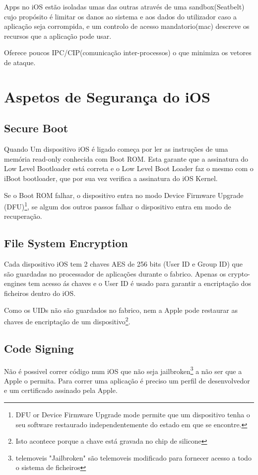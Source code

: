 
\hfill\par
Apps no iOS estão isoladas umas das outras através de uma sandbox(Seatbelt) cujo propósito é limitar os danos ao sistema e aos dados do utilizador caso a aplicação seja corrompida, e um controlo de acesso mandatorio(mac) descreve os recursos que a aplicação pode usar.\par

Oferece poucos IPC/CIP(comunicação inter-processos) o que minimiza os vetores de ataque.

\section{Aspetos de Segurança do iOS}

\subsection{Secure Boot}
\hfill\par

		Quando Um dispositivo iOS é ligado começa por ler as instruções de uma memória read-only conhecida com Boot ROM.
		Esta garante que a assinatura do Low Level Bootloader está correta e o Low Level Boot Loader faz o mesmo com o iBoot bootloader, que por sua vez verifica a assinatura do iOS Kernel.\par
		Se o Boot ROM falhar, o dispositivo entra no modo Device Firmware Upgrade (DFU)\footnote[1]{DFU or Device Firmware Upgrade mode permite que um dispositivo tenha o seu software restaurado independentemente do estado em que se encontre.}, se algum dos outros passos falhar o dispositivo entra em modo de recuperação.


\subsection{File System Encryption}
\hfill\par
	Cada dispositivo iOS tem 2 chaves AES de 256 bits (User ID e Group ID) que são guardadas no processador de aplicações durante o fabrico. Apenas os crypto-engines tem acesso ás chaves e o User ID é usado para garantir a encriptação dos ficheiros dentro do iOS.\par
	Como os UIDs não são guardados no fabrico, nem a Apple pode restaurar as chaves de encriptação de um dispositivo\footnote[2]{Isto acontece porque a chave está gravada no chip de silicone}.\par


\subsection{ Code Signing}
\hfill\par
	Não é possivel correr código num iOS que não seja jailbroken\footnote[3]{telemoveis "Jailbroken" são telemoveis modificado para fornecer acesso a todo o sistema de ficheiros\cite{ref_intro2}} a não ser que a Apple o permita. Para correr uma aplicação é preciso um perfil de desenvolvedor e um certificado assinado pela Apple.


